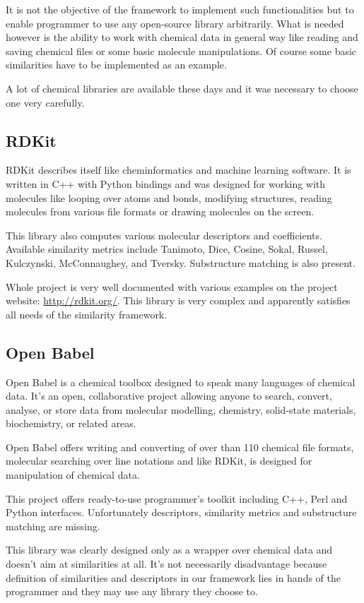 \documentclass[thesis=M,english]{FITthesis}[2012/10/20]
\begin{document}
It is not the objective of the framework to implement such functionalities but to enable programmer to use any open-source library arbitrarily. What is needed however is the ability to work with chemical data in general way like reading and saving chemical files or some basic molecule manipulations. Of course some basic similarities have to be implemented as an example. 

A lot of chemical libraries are available these days and it was necessary to choose one very carefully.


\subsection{RDKit}
RDKit describes itself like cheminformatics and machine learning software.  It is written in C++ with Python bindings and was designed for working with molecules like looping over atoms and bonds, modifying structures, reading molecules from various file formats or drawing molecules on the screen. 

This library also computes various molecular descriptors and coefficients. Available similarity metrics include Tanimoto, Dice, Cosine, Sokal, Russel, Kulczynski, McConnaughey, and Tversky. Substructure matching is also present.

Whole project is very well documented with various examples on the project website: \url{http://rdkit.org/}.
This library is very complex and apparently satisfies all needs of the similarity framework.


\subsection{Open Babel}
Open Babel is a chemical toolbox designed to speak many languages of chemical data. It's an open, collaborative project allowing anyone to search, convert, analyse, or store data from molecular modelling, chemistry, solid-state materials, biochemistry, or related areas.\cite{babel}

Open Babel offers writing and converting of over than 110 chemical file formats, molecular searching over line notations and like RDKit, is designed for manipulation of chemical data.

This project offers ready-to-use programmer’s toolkit including C++, Perl and Python interfaces. Unfortunately descriptors, similarity metrics and substructure matching are missing. 

This library was clearly designed only as a wrapper over chemical data and doesn’t aim at similarities at all. It’s not necessarily disadvantage because definition of similarities and descriptors in our framework lies in hands of the programmer and they may use any library they choose to. 
\end{document}
